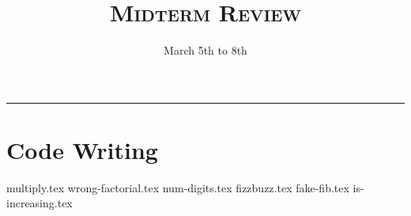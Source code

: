 \documentclass{exam}
\title{\textsc{Midterm Review}}
\date{March 5th to 8th}
\begin{document}
\maketitle
\rule{\textwidth}{0.15em}
\fontsize{12}{15}\selectfont


\section{Code Writing}
\begin{questions}
{multiply.tex}
\newpage
{wrong-factorial.tex}
\newpage
{num-digits.tex}
\newpage
{fizzbuzz.tex}
\newpage
{fake-fib.tex}
\newpage
{is-increasing.tex}



\end{questions}
\end{document}
